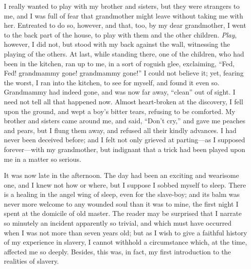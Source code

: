 I really wanted to play with my brother and sisters, but they were
strangers to me, and I was full of {\protect\hypertarget{49}{}{}}fear
that grandmother might leave without taking me with her. Entreated to do
so, however, and that, too, by my dear grandmother, I went to the back
part of the house, to play with them and the other children.
\emph{Play}, however, I did not, but stood with my back against the
wall, witnessing the playing of the others. At last, while standing
there, one of the children, who had been in the kitchen, ran up to me,
in a sort of roguish glee, exclaiming, ``Fed, Fed! grandmammy gone!
grandmammy gone!'' I could not believe it; yet, fearing the worst, I ran
into the kitchen, to see for myself, and found it even so. Grandmammy
had indeed gone, and was now far away, ``clean'' out of sight. I need
not tell all that happened now. Almost heart-broken at the discovery, I
fell upon the ground, and wept a boy's bitter tears, refusing to be
comforted. My brother and sisters came around me, and said, ``Don't
cry,'' and gave me peaches and pears, but I flung them away, and refused
all their kindly advances. I had never been deceived before; and I felt
not only grieved at parting---as I supposed forever---with my
grandmother, but indignant that a trick had been played upon me in a
matter so serious.

It was now late in the afternoon. The day had been an exciting and
wearisome one, and I knew not how or where, but I suppose I sobbed
myself to sleep. There is a healing in the angel wing of sleep, even for
the slave-boy; and its balm was never more welcome to any wounded soul
than it was to mine, the first night I spent at the domicile of old
master. The reader may be surprised that I narrate so minutely
{\protect\hypertarget{50}{}{}}an incident apparently so trivial, and
which must have occurred when I was not more than seven years old; but
as I wish to give a faithful history of my experience in slavery, I
cannot withhold a circumstance which, at the time, affected me so
deeply. Besides, this was, in fact, my first introduction to the
realities of slavery.

~
